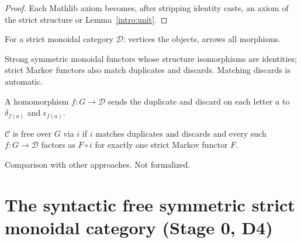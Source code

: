 \begin{proof}
\leanok
Each Mathlib axiom becomes, after stripping identity casts, an axiom of the
strict structure or Lemma~\ref{intro:unit}.
\end{proof}

\begin{definition}
\label{intro:underlying}
\leanok
{}
For a strict monoidal category $\mathcal D$: vertices the objects, arrows all
morphisms.
\end{definition}

\begin{definition}
\label{intro:strict-functor}
\leanok
{}
Strong symmetric monoidal functors whose structure isomorphisms are identities;
strict Markov functors also match duplicates and discards. Matching discards is
automatic.
\end{definition}

\begin{definition}
\label{intro:matches}
\leanok
{}
A homomorphism $f : G \to \mathcal D$ sends the duplicate and discard on each
letter $a$ to $\delta_{f(a)}$ and $\epsilon_{f(a)}$.
\end{definition}

\begin{definition}
\label{intro:free-markov}
\leanok
{}
$\mathcal C$ is free over $G$ via $i$ if $i$ matches duplicates and discards
and every such $f : G \to \mathcal D$ factors as $F \circ i$ for exactly one
strict Markov functor $F$.
\end{definition}

\begin{remark}[Remark 1.1]
\label{rem:1.1}
Comparison with other approaches. Not formalized.
\end{remark}

\section{The syntactic free symmetric strict monoidal category (Stage 0, D4)}

